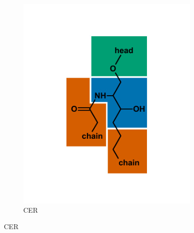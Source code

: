 {\begin{figure}[p]
\begin{subfigure}[b]{.45\linewidth}
    	\includegraphics[width=\linewidth]{figs_ch1/CER}
    	\caption{CER}
        \label{fig:CER}
    \end{subfigure}
    \end{figure}
\newpage
\begin{figure}[h]\ContinuedFloat
    \begin{subfigure}[b]{.45\linewidth}

\end{subfigure}
\end{figure}}
